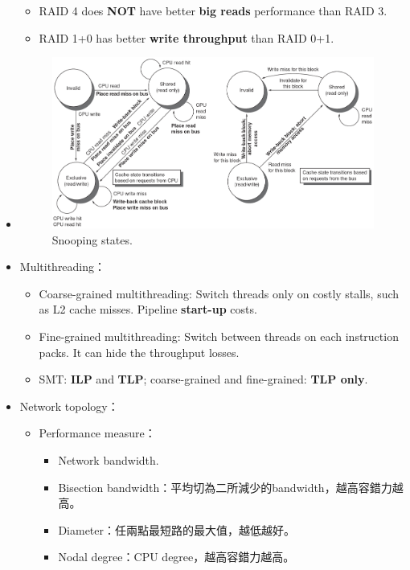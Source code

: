 \begin{itemize}
\begin{itemize}
        \item RAID 4 does \textbf{NOT} have better \textbf{big reads} performance than RAID 3.
        \item RAID 1+0 has better \textbf{write throughput} than RAID 0+1.
    \end{itemize}
    \item \quad\quad \begin{figure}[H]
        \centering
        \includegraphics[scale=0.5]{img/snooping.png}
        \caption{Snooping states.}
        \label{img:snooping}
    \end{figure}
    \item Multithreading： \begin{itemize}
        \item Coarse-grained multithreading: Switch threads only on costly stalls, such as L2 cache misses. Pipeline \textbf{start-up} costs.
        \item Fine-grained multithreading: Switch between threads on each instruction packs. It can hide the throughput losses.
        \item SMT: \textbf{ILP} and \textbf{TLP}; coarse-grained and fine-grained: \textbf{TLP only}.
    \end{itemize}
    \item Network topology： \begin{itemize}
        \item Performance measure：\begin{itemize}
            \item Network bandwidth.
            \item Bisection bandwidth：平均切為二所減少的bandwidth，越高容錯力越高。
            \item Diameter：任兩點最短路的最大值，越低越好。
            \item Nodal degree：CPU degree，越高容錯力越高。

\end{itemize}
\end{itemize}
\end{itemize}
